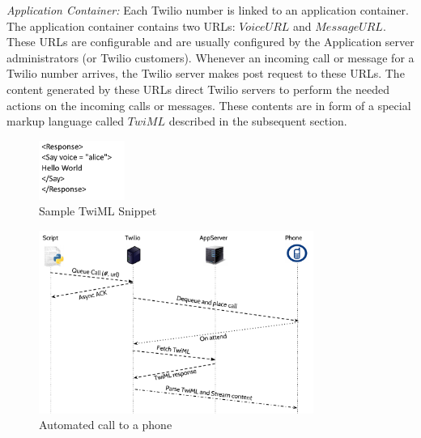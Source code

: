 \emph{Application Container: } Each Twilio number is linked to an application container. The application container contains two URLs: $Voice URL$ and $Message URL$. These URLs are configurable and are usually configured by the Application server administrators (or Twilio customers). Whenever an incoming call or message for a Twilio number arrives, the Twilio server makes post request to these URLs. The content generated by these URLs direct Twilio servers to perform the needed actions on the incoming calls or messages. These contents are in form of a special markup language called $TwiML$ described in the subsequent section.
 \begin{figure}
 \centering
   \includegraphics[width=0.25\textwidth]{figs/TwiML.png}
 \caption{Sample TwiML Snippet}
 \label{fig:TwilML}
 \end{figure} 
\begin{figure}[t!] 
\centering
  \includegraphics[width=0.8\textwidth]{figs/auto.pdf}
\caption{Automated call to a phone}
\label{fig:autocall}
\end{figure} 

